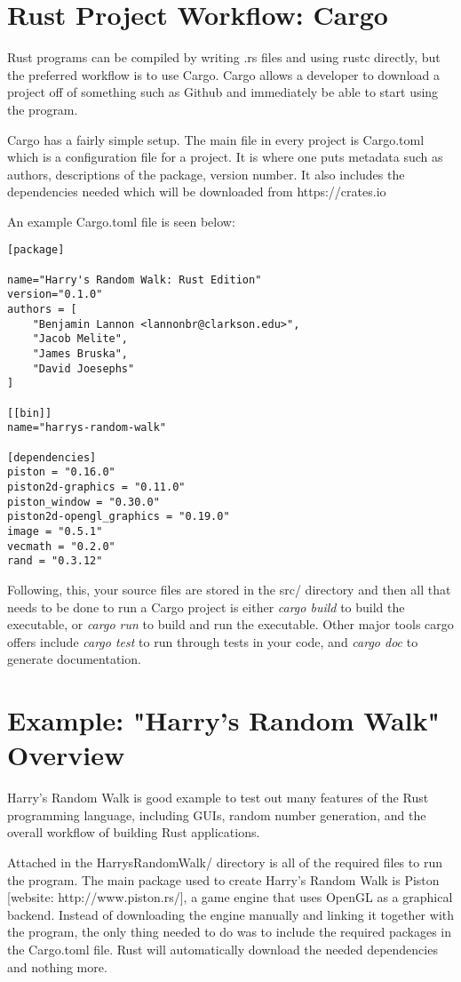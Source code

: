 \documentclass{article}
\begin{document}
\section{Rust Project Workflow: Cargo}
Rust programs can be compiled by writing .rs files and using rustc directly, but the preferred workflow is to use Cargo. Cargo allows a developer to download a project off of something such as Github and immediately be able to start using the program.

Cargo has a fairly simple setup. The main file in every project is Cargo.toml which is a configuration file for a project. It is where one puts metadata such as authors, descriptions of the package, version number. It also includes the dependencies needed which will be downloaded from https://crates.io

An example Cargo.toml file is seen below:

\begin{lstlisting}
[package]

name="Harry's Random Walk: Rust Edition"
version="0.1.0"
authors = [
	"Benjamin Lannon <lannonbr@clarkson.edu>",
	"Jacob Melite",
	"James Bruska",
	"David Joesephs"
]

[[bin]]
name="harrys-random-walk"

[dependencies]
piston = "0.16.0"
piston2d-graphics = "0.11.0"
piston_window = "0.30.0"
piston2d-opengl_graphics = "0.19.0"
image = "0.5.1"
vecmath = "0.2.0"
rand = "0.3.12"
\end{lstlisting}

Following, this, your source files are stored in the src/ directory and then all that needs to be done to run a Cargo project is either \emph{cargo build} to build the executable, or \emph{cargo run} to build and run the executable. Other major tools cargo offers include \emph{cargo test} to run through tests in your code, and \emph{cargo doc} to generate documentation.

\section{Example: "Harry's Random Walk" Overview}
Harry's Random Walk is good example to test out many features of the Rust programming language, including GUIs, random number generation, and the overall workflow of building Rust applications.

Attached in the HarrysRandomWalk/ directory is all of the required files to run the program. The main package used to create Harry's Random Walk is Piston [website: http://www.piston.rs/], a game engine that uses OpenGL as a graphical backend. Instead of downloading the engine manually and linking it together with the program, the only thing needed to do was to include the required packages in the Cargo.toml file. Rust will automatically download the needed dependencies and nothing more.
\end{document}
